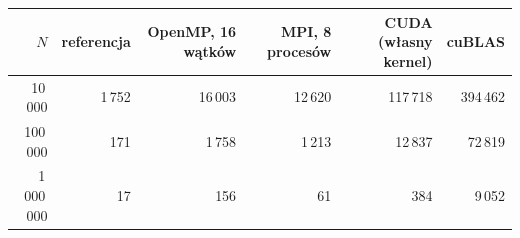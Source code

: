\begin{tabular}{rrrrrr}
\toprule
$N$ & referencja & OpenMP, 16 wątków & MPI, 8 procesów & CUDA (własny kernel) & cuBLAS \\
\midrule
10\,000 & 1\,752 & 16\,003 & 12\,620 & 117\,718 & 394\,462 \\
100\,000 & 171 & 1\,758 & 1\,213 & 12\,837 & 72\,819 \\
1\,000\,000 & 17 & 156 & 61 & 384 & 9\,052 \\
\bottomrule
\end{tabular}
